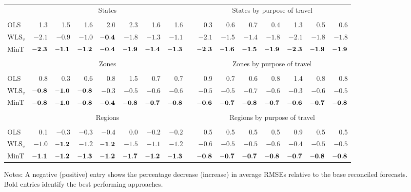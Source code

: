 \documentclass[10pt,a4paper]{article}
\begin{document}
\begin{enumerate}
{\begin{table*}[!htb]
\begin{threeparttable}
\begin{tabular}{lrrrrrrrrrrrrrrr}
				& \multicolumn{7}{c}{States} &  & \multicolumn{7}{c}{States by purpose of travel} \\
				\cline{2-8}\cline{10-16} \\[-0.3cm]
				OLS & 1.3 & 1.5 & 1.6 & 2.0 & 2.3 & 1.6 & 1.6 & & 0.3 & 0.6 & 0.7 & 0.4 & 1.3 & 0.5 & 0.6 \\
				WLS$_v$ & $-2.1$ & $-0.9$ & $-1.0$ & $\bf{ -0.4}$ & $-1.8$ & $-1.3$ & $-1.1$ & & $-2.1$ & $-1.5$ & $-1.4$ & $-1.8$ & $-2.1$ & $-1.8$ & $-1.8$ \\
				MinT & $\bf{ -2.3}$ & $\bf{ -1.1}$ & $\bf{ -1.2}$ & $\bf{ -0.4}$ & $\bf{ -1.9}$ & $\bf{ -1.4}$ & $\bf{ -1.3}$ & & $\bf{ -2.3}$ & $\bf{ -1.6}$ & $\bf{ -1.5}$ & $\bf{ -1.9}$ & $\bf{ -2.3}$ & $\bf{ -1.9}$ & $\bf{ -1.9}$ \\
				\cline{2-8}\cline{10-16} \\[-0.3cm]
				& \multicolumn{7}{c}{Zones} & & \multicolumn{7}{c}{Zones by purpose of travel} \\
				\cline{2-8}\cline{10-16} \\[-0.3cm]
				OLS & 0.8 & 0.3 & 0.6 & 0.8 & 1.5 & 0.7 & 0.7 & & 0.9 & 0.7 & 0.6 & 0.8 & 1.4 & 0.8 & 0.8 \\
				WLS$_v$ & $\bf{ -0.8}$ & $\bf{ -1.0}$ & $\bf{ -0.8}$ & $-0.3$ & $-0.5$ & $-0.6$ & $-0.6$ & & $-0.5$ & $-0.5$ & $-0.7$ & $-0.6$ & $-0.3$ & $-0.6$ & $-0.5$ \\
				MinT & $\bf{ -0.8}$ & $\bf{ -1.0}$ & $\bf{ -0.8}$ & $\bf{ -0.4}$ & $\bf{ -0.8}$ & $\bf{ -0.7}$ & $\bf{ -0.8}$ & & $\bf{ -0.6}$ & $\bf{ -0.7}$ & $\bf{ -0.8}$ & $\bf{ -0.7}$ & $\bf{ -0.6}$ & $\bf{ -0.7}$ & $\bf{ -0.8}$ \\
				\cline{2-8}\cline{10-16} \\[-0.3cm]
				& \multicolumn{7}{c}{Regions} & & \multicolumn{7}{c}{Regions by purpose of travel} \\
				\cline{2-8}\cline{10-16} \\[-0.3cm]
				OLS  & 0.1 & $-0.3$ & $-0.3$ & $-0.4$ & 0.0 & $-0.2$ & $-0.2$ & & 0.5 & 0.5 & 0.5 & 0.5 & 0.9 & 0.5 & 0.5\\
				WLS$_v$ & $-1.0$ & $\bf{ -1.2}$ & $-1.2$ & $\bf{ -1.2}$ & $-1.5$ & $-1.1$ & $-1.2$ & & $-0.6$ & $-0.5$ & $-0.5$ & $-0.6$ & $-0.4$ & $-0.5$ & $-0.5$ \\
				MinT & $\bf{ -1.1}$ & $\bf{ -1.2}$ & $\bf{ -1.3}$ & $\bf{ -1.2}$ & $\bf{ -1.7}$ & $\bf{ -1.2}$ & $\bf{ -1.3}$ & & $\bf{ -0.8}$ & $\bf{ -0.7}$ & $\bf{ -0.7}$ & $\bf{ -0.8}$ & $\bf{ -0.7}$ & $\bf{ -0.8}$ & $\bf{ -0.8}$ \\
				\bottomrule
			\end{tabular}
		\end{threeparttable}
	\end{table*}
	
}
\end{enumerate}
\end{document}
